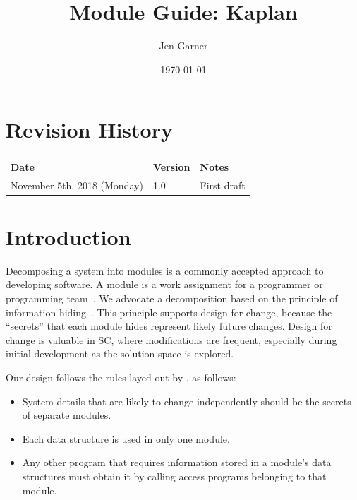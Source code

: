 \documentclass[12pt, titlepage]{article}
\newcommand{\progname}{Kaplan} %
\begin{document}
\title{Module Guide: \progname{} } 
\author{Jen Garner}
\date{\today}

\maketitle


\section{Revision History}

\begin{tabularx}{\textwidth}{p{3cm}p{2cm}X}
\toprule {\bf Date} & {\bf Version} & {\bf Notes}\\
\midrule
November 5th, 2018 (Monday) & 1.0 & First draft \\
\bottomrule
\end{tabularx}

\newpage

\tableofcontents

\listoftables

\listoffigures

\newpage


\section{Introduction}

Decomposing a system into modules is a commonly accepted approach to developing
software.  A module is a work assignment for a programmer or programming
team~\citep{ParnasEtAl1984}.  We advocate a decomposition
based on the principle of information hiding~\citep{Parnas1972a}.  This
principle supports design for change, because the ``secrets'' that each module
hides represent likely future changes.  Design for change is valuable in SC,
where modifications are frequent, especially during initial development as the
solution space is explored.  

Our design follows the rules layed out by \citet{ParnasEtAl1984}, as follows:
\begin{itemize}
\item System details that are likely to change independently should be the
  secrets of separate modules.
\item Each data structure is used in only one module.
\item Any other program that requires information stored in a module's data
  structures must obtain it by calling access programs belonging to that module.
\end{itemize}
\end{document}
